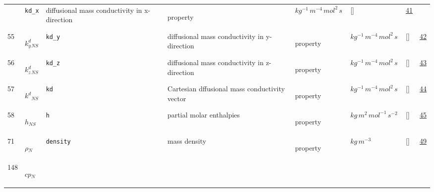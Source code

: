 \begin{longtable}{|p{1cm}|p{3cm}|p{3cm}|p{7cm}|p{3.0cm}|p{3cm}|p{2cm}|p{1cm}|}
             & \verb|kd_x|
             & diffusional mass conductivity in x-direction
             & \begin{lay}property \end{lay}
             & $ kg^{-1} \,m^{-4} \,mol^{2} \,s \, $
             & []
             & \hyperlink{"e:41"}{ 41 }
                 \\
    55
             & \hypertarget{"v:55"}{ $ {k^d_y}{_{{N S}}} $}
             & \verb|kd_y|
             & diffusional mass conductivity in y-direction
             & \begin{lay}property \end{lay}
             & $ kg^{-1} \,m^{-4} \,mol^{2} \,s \, $
             & []
             & \hyperlink{"e:42"}{ 42 }
                 \\
    56
             & \hypertarget{"v:56"}{ $ {k^d_z}{_{{N S}}} $}
             & \verb|kd_z|
             & diffusional mass conductivity in z-direction
             & \begin{lay}property \end{lay}
             & $ kg^{-1} \,m^{-4} \,mol^{2} \,s \, $
             & []
             & \hyperlink{"e:43"}{ 43 }
                 \\
    57
             & \hypertarget{"v:57"}{ $ {k^d}{_{{N S}}} $}
             & \verb|kd|
             & Cartesian dffusional mass conductivity vector
             & \begin{lay}property \end{lay}
             & $ kg^{-1} \,m^{-4} \,mol^{2} \,s \, $
             & []
             & \hyperlink{"e:44"}{ 44 }
                 \\
    58
             & \hypertarget{"v:58"}{ $ {h}{_{{N S}}} $}
             & \verb|h|
             & partial molar enthalpies
             & \begin{lay}property \end{lay}
             & $ kg \,m^{2} \,mol^{-1} \,s^{-2} \, $
             & []
             & \hyperlink{"e:45"}{ 45 }
                 \\
    71
             & \hypertarget{"v:71"}{ $ {\rho}{_{N}} $}
             & \verb|density|
             & mass density
             & \begin{lay}property \end{lay}
             & $ kg \,m^{-3} \, $
             & []
             & \hyperlink{"e:49"}{ 49 }
                 \\
    148
             & \hypertarget{"v:148"}{ $ {cp}{_{N}} $}

\end{longtable}
